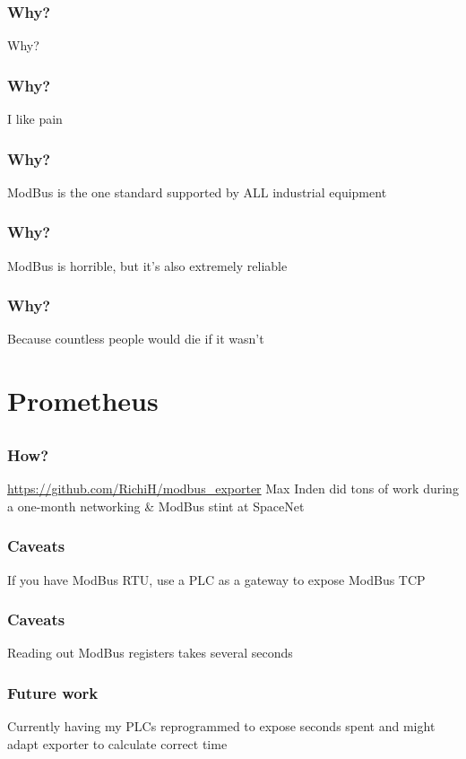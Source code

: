 \documentclass[aspectratio=169]{beamer}
\begin{document}
\begin{frame}
	\frametitle{Why?}
	\centering
	\vfill
	Why?
	\vfill
\end{frame}

\begin{frame}
	\frametitle{Why?}
	\centering
	\vfill
	I like pain
	\vfill
\end{frame}

\begin{frame}
	\frametitle{Why?}
	\centering
	\vfill
	ModBus is the one standard supported by ALL industrial equipment
	\vfill
\end{frame}

\begin{frame}
	\frametitle{Why?}
	\centering
	\vfill
	ModBus is horrible, but it's also extremely reliable
	\vfill
\end{frame}

\begin{frame}
	\frametitle{Why?}
	\centering
	\vfill
	Because countless people would die if it wasn't
	\vfill
\end{frame}



\section{Prometheus}


\subsection{}

\begin{frame}
	\frametitle{How?}
	\centering
	\vfill
	\url{https://github.com/RichiH/modbus_exporter}
	\vfill
	Max Inden did tons of work during a one-month networking \& ModBus stint at SpaceNet
	\vfill
\end{frame}

\begin{frame}
	\frametitle{Caveats}
	\centering
	\vfill
	If you have ModBus RTU, use a PLC as a gateway to expose ModBus TCP
	\vfill
\end{frame}

\begin{frame}
	\frametitle{Caveats}
	\centering
	\vfill
	Reading out ModBus registers takes several seconds
	\vfill
\end{frame}

\begin{frame}
	\frametitle{Future work}
	\centering
	\vfill
	Currently having my PLCs reprogrammed to expose seconds spent and might adapt exporter to calculate correct time
	\vfill
\end{frame}
\end{document}
